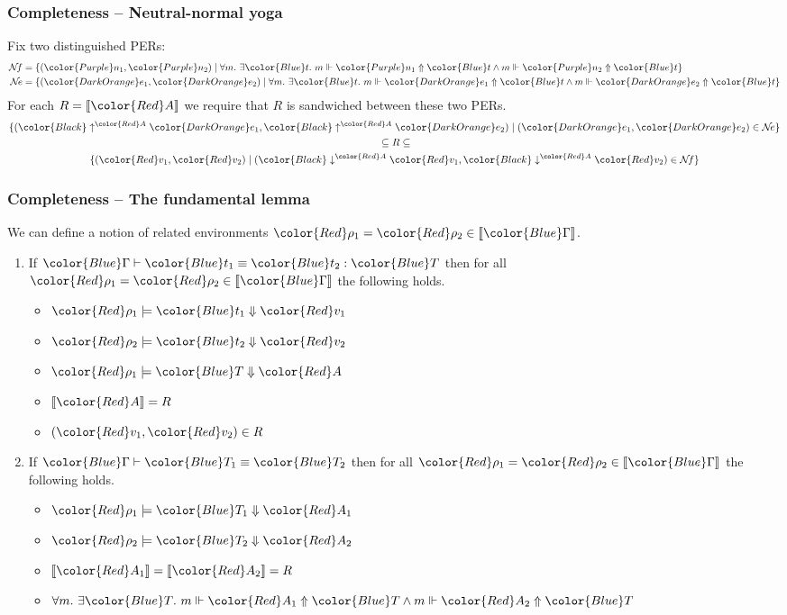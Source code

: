 \documentclass[svgnames]{beamer}
\newcommand\fmttm[1]{{\color{Blue}#1}}
\newcommand\fmtval[1]{{\color{Red}#1}}
\newcommand\fmtne[1]{{\color{DarkOrange}#1}}
\newcommand\fmtnf[1]{{\color{Purple}#1}}
\newcommand{\sem}[1]{\llbracket #1 \rrbracket}
\newcommand{\vup}[2]{{\color{Black} \uparrow^{\fmtval{#1}} \fmtne{#2}}}
\newcommand{\vnf}[2]{{\color{Black} \downarrow^{\fmtval{#1}} \fmtval{#2}}}
\newcommand{\eqterm}[4]{\fmttm{#1} \vdash \fmttm{#2} \equiv \fmttm{#3} : \fmttm{#4}}
\newcommand{\eqtype}[3]{\fmttm{#1}\vdash\fmttm{#2} \equiv \fmttm{#3}}
\newcommand{\Nf}{\mathcal{N}\!f}
\newcommand{\Ne}{\mathcal{N}\!e}
\newcommand{\gpheval}[3]{\fmtval{#1}\models\fmttm{#2}\Downarrow\fmtval{#3}}
\newcommand{\gphquone}[3]{#1\Vdash\fmtne{#2}\Uparrow\fmttm{#3}}
\newcommand{\gphquotp}[3]{#1\Vdash\fmtval{#2}\Uparrow\fmttm{#3}}
\newcommand{\gphquonf}[3]{#1\Vdash\fmtnf{#2}\Uparrow\fmttm{#3}}
\begin{document}
\begin{frame}
  \frametitle{Completeness -- Neutral-normal yoga}
  Fix two distinguished PERs:
  \begin{align*}
    \Nf &= \{(\fmtnf{n_1}, \fmtnf{n_2}) \mid \forall m.\ \exists \fmttm{t}.\ \gphquonf{m}{n_1}{t} \land \gphquonf{m}{n_2}{t}\}\\
    \Ne &= \{(\fmtne{e_1}, \fmtne{e_2}) \mid \forall m.\ \exists \fmttm{t}.\ \gphquone{m}{e_1}{t} \land \gphquone{m}{e_2}{t}\}\\
  \end{align*}
  For each $R = \sem{\fmtval{A}}$ we require that $R$ is sandwiched between these two PERs.
  \begin{gather*}
    \{(\vup{A}{e_1}, \vup{A}{e_2}) \mid (\fmtne{e_1}, \fmtne{e_2}) \in \Ne\}\\
    {}\subseteq R \subseteq\\
    \{(\fmtval{v_1}, \fmtval{v_2}) \mid (\vnf{A}{v_1}, \vnf{A}{v_2}) \in \Nf\}
  \end{gather*}
\end{frame}


\begin{frame}
  \frametitle{Completeness -- The fundamental lemma}
  We can define a notion of related environments
  $\fmtval{\rho_1} = \fmtval{\rho_2} \in \sem{\fmttm{\Gamma}}$.

  \begin{enumerate}
  \item If $\eqterm{\Gamma}{t_1}{t_2}{T}$ then for all
    $\fmtval{\rho_1} = \fmtval{\rho_2} \in \sem{\fmttm{\Gamma}}$ the following holds.
    \begin{itemize}
    \item $\gpheval{\rho_1}{t_1}{v_1}$
    \item $\gpheval{\rho_2}{t_2}{v_2}$
    \item $\gpheval{\rho_1}{T}{A}$
    \item $\sem{\fmtval{A}} = R$
    \item $(\fmtval{v_1}, \fmtval{v_2}) \in R$
    \end{itemize}
  \item If $\eqtype{\Gamma}{T_1}{T_2}$ then for all
    $\fmtval{\rho_1} = \fmtval{\rho_2} \in \sem{\fmttm{\Gamma}}$ the following holds.
    \begin{itemize}
    \item $\gpheval{\rho_1}{T_1}{A_1}$
    \item $\gpheval{\rho_2}{T_2}{A_2}$
    \item $\sem{\fmtval{A_1}} = \sem{\fmtval{A_2}} = R$
    \item $\forall m.\ \exists \fmttm{T}.\ \gphquotp{m}{A_1}{T} \land \gphquotp{m}{A_2}{T}$
    \end{itemize}
  \end{enumerate}
\end{frame}
\end{document}

